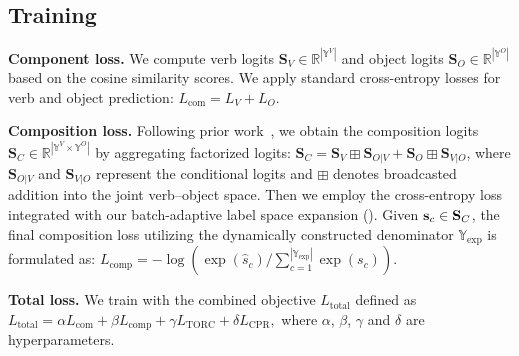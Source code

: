 \subsection{Training}
\label{sec:training_loss}

\noindent\textbf{Component loss.}
We compute verb logits $\mathbf{S}_V \in \mathbb{R}^{|\mathbb{Y}^V|}$ and object logits $\mathbf{S}_O \in \mathbb{R}^{|\mathbb{Y}^O|}$ based on the cosine similarity scores.  
We apply standard cross-entropy losses for verb and object prediction: $L_{\text{com}} = L_V + L_O$.



\noindent\textbf{Composition loss.}
Following prior work~\cite{li2024c2c}, we obtain the composition logits $\mathbf{S}_C \in \mathbb{R}^{|\mathbb{Y}^V \times \mathbb{Y}^O|}$ by aggregating factorized logits: $\mathbf{S}_C = \mathbf{S}_V \boxplus \mathbf{S}_{O|V} + \mathbf{S}_O \boxplus \mathbf{S}_{V|O}$, where $\mathbf{S}_{O|V}$ and $\mathbf{S}_{V|O}$ represent the conditional logits and $\boxplus$ denotes broadcasted addition into the joint verb--object space.
Then we employ the cross-entropy loss integrated with our batch-adaptive label space expansion (). 
Given $\mathbf{s}_c \in \mathbf{S}_C$, the final composition loss utilizing the dynamically constructed denominator $\mathbb{Y}_{\text{exp}}$ is formulated as: $L_{\text{comp}}
= - \log (\exp(\hat{s}_{c})/\sum_{c=1}^{|\mathbb{Y}_{\text{exp}}|} \exp(s_c))$.





\noindent\textbf{Total loss.}
We train \ours{} with the combined objective $L_{\text{total}}$ defined as
$L_{\text{total}}
= \alpha L_{\text{com}}
+ \beta L_{\text{comp}}
+ \gamma L_{\text{TORC}}
+ \delta L_{\text{CPR}},$
where $\alpha$, $\beta$, $\gamma$ and $\delta$ are hyperparameters.

